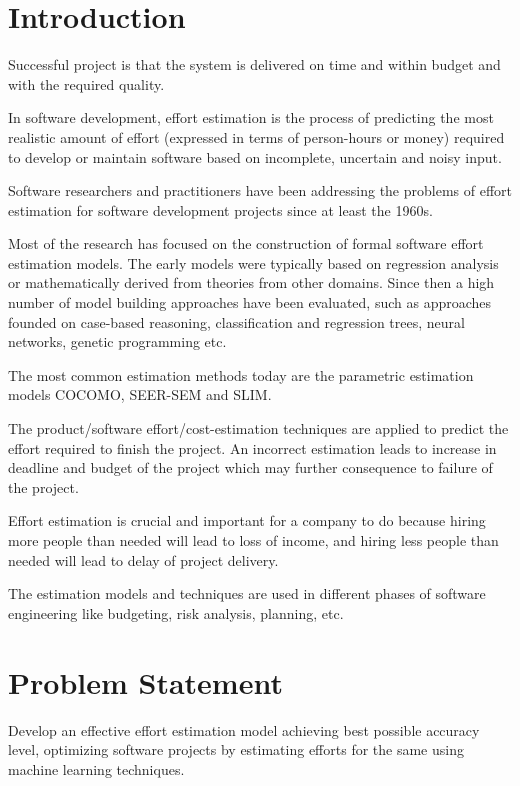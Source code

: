 \documentclass[a4paper,12pt]{article}
\begin{document}
\section{Introduction}
Successful project is that the system is delivered on time and within budget and with the
required quality. 

In software development, effort estimation is the process of predicting the most realistic
amount of effort (expressed in terms of person-hours or money) required to develop or maintain
software based on incomplete, uncertain and noisy input. 

Software researchers and practitioners have been addressing the problems of effort estimation
for software development projects since at least the 1960s. 

Most of the research has focused on the construction of formal software effort estimation
models. The early models were typically based on regression analysis or mathematically
derived from theories from other domains. Since then a high number of model building
approaches have been evaluated, such as approaches founded on case-based reasoning,
classification and regression trees, neural networks, genetic programming etc. 

The most common estimation methods today are the parametric estimation models COCOMO,
SEER-SEM and SLIM. 

The product/software effort/cost-estimation techniques are applied to predict the effort required
to finish the project. An incorrect estimation leads to increase in deadline and budget of the
project which may further consequence to failure of the project. 

Effort estimation is crucial and important for a company to do because hiring more people than
needed will lead to loss of income, and hiring less people than needed will lead to delay of
project delivery. 

The estimation models and techniques are used in different phases of software engineering like
budgeting, risk analysis, planning, etc.

\section{Problem Statement}
Develop an effective effort estimation model achieving best possible accuracy level,
optimizing software projects by estimating efforts for the same using machine learning
techniques.
\end{document}
